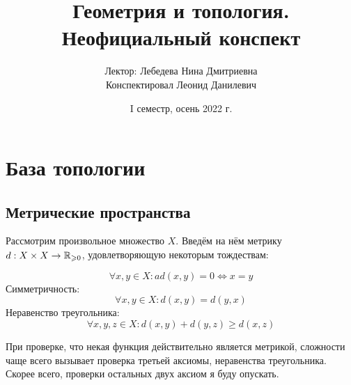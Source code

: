 \documentclass[a4paper]{report}
\date{I семестр, осень 2022 г.}
\title{Геометрия и топология. Неофициальный конспект}
\author{Лектор: Лебедева Нина Дмитриевна \\ Конспектировал Леонид Данилевич}
\begin{document}
    \maketitle
    \tableofcontents
    \newpage
    \setcounter{lection}{0}


    \chapter{База топологии}


    \section{Метрические пространства}
    Рассмотрим произвольное множество $X$.
    Введём на нём метрику $d: X \times X \rightarrow \mathbb{R}_{\geqslant 0}$, удовлетворяющую некоторым тождествам:

    \begin{equation}
        \forall x, y \in X: ad(x, y) = 0 \iff x = y
    \end{equation}
    Симметричность:
    \begin{equation}
        \forall x, y \in X: d(x, y) = d(y, x)
    \end{equation}
    Неравенство треугольника:
    \begin{equation}
        \forall x, y, z \in X: d(x, y) + d(y, z) \ge d(x, z)
    \end{equation}

    При проверке, что некая функция действительно является метрикой, сложности чаще всего вызывает проверка третьей аксиомы, неравенства треугольника.
    Скорее всего, проверки остальных двух аксиом я буду опускать.
\end{document}
